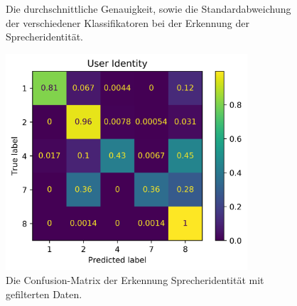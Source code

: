 \begin{figure}[H]
\centering     %
{}
\caption{Die durchschnittliche Genauigkeit, sowie die Standardabweichung der verschiedener Klassifikatoren bei der Erkennung der Sprecheridentität.}
 \label{fig:vergleich}
\end{figure}

\begin{figure}[H]
  \centering
  \includegraphics[width=90mm ,scale=0.6]{AllUserConfMat.png}
  \caption{Die Confusion-Matrix der Erkennung Sprecheridentität mit gefilterten Daten.}
  \label{fig:Usercnf2}
\end{figure}

